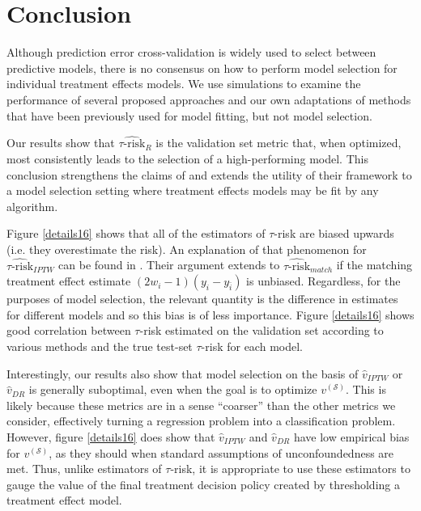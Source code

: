 \section{Conclusion}
\label{conclusion}

Although prediction error cross-validation is widely used to select between predictive models, there is no consensus on how to perform model selection for individual treatment effects models. We use simulations to examine the performance of several proposed approaches and our own adaptations of methods that have been previously used for model fitting, but not model selection. 

Our results show that $\widehat{\tau\text{-risk}}_{R}$ is the validation set metric that, when optimized, most consistently leads to the selection of a high-performing model. This conclusion strengthens the claims of \citet{Nie:2017vi} and extends the utility of their framework to a model selection setting where treatment effects models may be fit by any algorithm. 

Figure \ref{details16} shows that all of the estimators of $\tau$-risk are biased upwards (i.e. they overestimate the risk). An explanation of that phenomenon for $\widehat{\tau\text{-risk}}_{IPTW}$ can be found in \citet{Gutierrez:2016tq}. Their argument extends to $\widehat{\tau\text{-risk}}_{match}$ if the matching treatment effect estimate $(2w_i -1)(y_i - y_{\bar i})$ is unbiased. Regardless, for the purposes of model selection, the relevant quantity is the difference in estimates for different models and so this bias is of less importance. Figure \ref{details16} shows good correlation between $\tau$-risk estimated on the validation set according to various methods and the true test-set $\tau$-risk for each model. 

Interestingly, our results also show that model selection on the basis of $\hat v_{IPTW}$ or $\hat v_{DR}$ is generally suboptimal, even when the goal is to optimize $v^{(\mathcal S)}$. This is likely because these metrics are in a sense ``coarser'' than the other metrics we consider, effectively turning a regression problem into a classification problem. However, figure \ref{details16} does show that $\hat v_{IPTW}$ and $\hat v_{DR}$ have low empirical bias for $v^{(\mathcal S)}$, as they should when standard assumptions of unconfoundedness are met. Thus, unlike estimators of $\tau$-risk, it is appropriate to use these estimators to gauge the value of the final treatment decision policy created by thresholding a treatment effect model.

